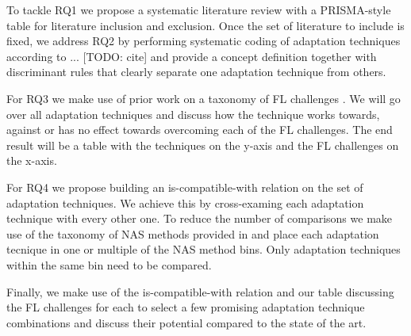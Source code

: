 To tackle RQ1 we propose a systematic literature review with a PRISMA-style table for literature inclusion and exclusion. Once the set of literature to include is fixed, we address RQ2 by performing systematic coding of adaptation techniques according to ... [TODO: cite] and provide a concept definition together with discriminant rules that clearly separate one adaptation technique from others. 

For RQ3 we make use of prior work on a taxonomy of FL challenges \cite{fl_taxonomy_2024}. We will go over all adaptation techniques and discuss how the technique works towards, against or has no effect towards overcoming each of the FL challenges. The end result will be a table with the techniques on the y-axis and the FL challenges on the x-axis.

For RQ4 we propose building an is-compatible-with relation on the set of adaptation techniques. We achieve this by cross-examing each adaptation technique with every other one. To reduce the number of comparisons we make use of the taxonomy of NAS methods provided in \cite{nas_1000_papers_2023} and place each adaptation tecnique in one or multiple of the NAS method bins. Only adaptation techniques within the same bin need to be compared.

Finally, we make use of the is-compatible-with relation and our table discussing the FL challenges for each to select a few promising adaptation technique combinations and discuss their potential compared to the state of the art.
